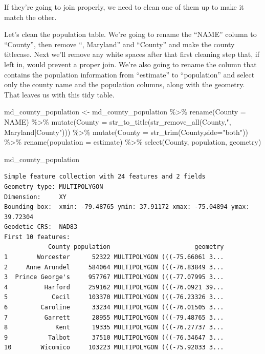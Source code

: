 \documentclass[
  letterpaper,
  DIV=11,
  numbers=noendperiod]{scrreprt}
\newenvironment{Shaded}{\begin{snugshade}}{\end{snugshade}}
\newcommand{\AttributeTok}[1]{\textcolor[rgb]{0.40,0.45,0.13}{#1}}
\newcommand{\FunctionTok}[1]{\textcolor[rgb]{0.28,0.35,0.67}{#1}}
\newcommand{\NormalTok}[1]{\textcolor[rgb]{0.00,0.23,0.31}{#1}}
\newcommand{\OtherTok}[1]{\textcolor[rgb]{0.00,0.23,0.31}{#1}}
\newcommand{\SpecialCharTok}[1]{\textcolor[rgb]{0.37,0.37,0.37}{#1}}
\newcommand{\StringTok}[1]{\textcolor[rgb]{0.13,0.47,0.30}{#1}}
\begin{document}
If they're going to join properly, we need to clean one of them up to
make it match the other.

Let's clean the population table. We're going to rename the ``NAME''
column to ``County'', then remove ``, Maryland'' and ``County'' and make
the county titlecase. Next we'll remove any white spaces after that
first cleaning step that, if left in, would prevent a proper join. We're
also going to rename the column that contains the population information
from ``estimate'' to ``population'' and select only the county name and
the population columns, along with the geometry. That leaves us with
this tidy table.

\begin{Shaded}
\begin{Highlighting}[]
\NormalTok{md\_county\_population }\OtherTok{\textless{}{-}}\NormalTok{ md\_county\_population }\SpecialCharTok{\%\textgreater{}\%}
  \FunctionTok{rename}\NormalTok{(}\AttributeTok{County =}\NormalTok{ NAME) }\SpecialCharTok{\%\textgreater{}\%}
  \FunctionTok{mutate}\NormalTok{(}\AttributeTok{County =} \FunctionTok{str\_to\_title}\NormalTok{(}\FunctionTok{str\_remove\_all}\NormalTok{(County,}\StringTok{", Maryland|County"}\NormalTok{))) }\SpecialCharTok{\%\textgreater{}\%}
  \FunctionTok{mutate}\NormalTok{(}\AttributeTok{County =} \FunctionTok{str\_trim}\NormalTok{(County,}\AttributeTok{side=}\StringTok{"both"}\NormalTok{)) }\SpecialCharTok{\%\textgreater{}\%}
  \FunctionTok{rename}\NormalTok{(}\AttributeTok{population =}\NormalTok{ estimate) }\SpecialCharTok{\%\textgreater{}\%}
  \FunctionTok{select}\NormalTok{(County, population, geometry)}

\NormalTok{md\_county\_population}
\end{Highlighting}
\end{Shaded}

\begin{verbatim}
Simple feature collection with 24 features and 2 fields
Geometry type: MULTIPOLYGON
Dimension:     XY
Bounding box:  xmin: -79.48765 ymin: 37.91172 xmax: -75.04894 ymax: 39.72304
Geodetic CRS:  NAD83
First 10 features:
            County population                       geometry
1        Worcester      52322 MULTIPOLYGON (((-75.66061 3...
2     Anne Arundel     584064 MULTIPOLYGON (((-76.83849 3...
3  Prince George's     957767 MULTIPOLYGON (((-77.07995 3...
4          Harford     259162 MULTIPOLYGON (((-76.0921 39...
5            Cecil     103370 MULTIPOLYGON (((-76.23326 3...
6         Caroline      33234 MULTIPOLYGON (((-76.01505 3...
7          Garrett      28955 MULTIPOLYGON (((-79.48765 3...
8             Kent      19335 MULTIPOLYGON (((-76.27737 3...
9           Talbot      37510 MULTIPOLYGON (((-76.34647 3...
10        Wicomico     103223 MULTIPOLYGON (((-75.92033 3...
\end{verbatim}
\end{document}
